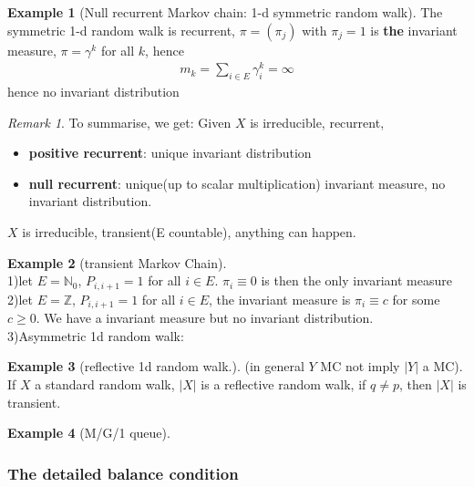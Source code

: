 \documentclass[a4paper,11pt]{book}
\theoremstyle{definition}
\newtheorem*{example}{Example}
\theoremstyle{remark}
\newtheorem*{remark}{Remark}
\begin{document}
\begin{example}[Null recurrent Markov chain: 1-d symmetric random walk]
The symmetric 1-d random walk is recurrent, $\pi = (\pi_j)$ with $\pi_j = 1$ is \textbf{the} invariant measure, $\pi = \gamma^k$ for all $k$, hence
\begin{align*}
	m_k = \sum_{i \in E} \gamma_i^k = \infty
\end{align*}	
hence no invariant distribution
\end{example}

\begin{remark}
To summarise, we get: Given $X$ is irreducible, recurrent, 
\begin{itemize}
	\item \textbf{positive recurrent}: unique invariant distribution
	\item \textbf{null recurrent}: unique(up to scalar multiplication) invariant measure, no invariant distribution.
\end{itemize}	
$X$ is irreducible, transient(E countable), anything can happen.
\end{remark}

\begin{example}[transient Markov Chain]\quad\\
1)let $E = \mathbb{N}_0$, $P_{i, i+1} = 1$ for all $ i \in E$. $\pi_i 
\equiv 0$ is then the only invariant measure\\
2)let $E = \mathbb{Z}$, $P_{i, i+1} = 1$ for all $i \in E$, the invariant measure is $\pi_i \equiv c$ for some $c \ge 0$. We have a invariant measure but no invariant distribution. 	\\
3)Asymmetric 1d random walk:

\end{example}

\begin{example}[reflective 1d random walk.]
(in general $Y$ MC not imply $|Y|$ a MC). If $X$ a standard random walk, $|X|$ is a reflective random walk, if $q \neq p$, then $|X|$ is transient.
\end{example}

\begin{example}[M/G/1 queue]
	
\end{example}


\subsubsection*{The detailed balance condition}
\end{document}
